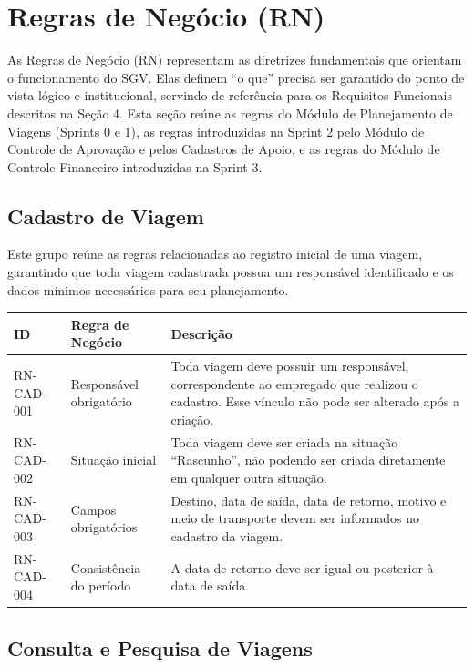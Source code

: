 \documentclass[12pt,article,oneside,a4paper]{abntex2}
\begin{document}
\section{Regras de Negócio (RN)}

As Regras de Negócio (RN) representam as diretrizes fundamentais que orientam
o funcionamento do SGV. Elas definem ``o que'' precisa ser garantido do ponto
de vista lógico e institucional, servindo de referência para os Requisitos
Funcionais descritos na Seção 4. Esta seção reúne as regras do Módulo de
Planejamento de Viagens (Sprints 0 e 1), as regras introduzidas na Sprint 2
pelo Módulo de Controle de Aprovação e pelos Cadastros de Apoio, e as regras
do Módulo de Controle Financeiro introduzidas na Sprint 3.

\subsection{Cadastro de Viagem}

Este grupo reúne as regras relacionadas ao registro inicial de uma viagem,
garantindo que toda viagem cadastrada possua um responsável identificado e os
dados mínimos necessários para seu planejamento.

\begin{xltabular}{\textwidth}{|l|l|Y|}
\hline
{}
\textbf{ID} & \textbf{Regra de Negócio} & \textbf{Descrição} \\
\hline
\endhead
RN-CAD-001 & Responsável obrigatório & Toda viagem deve possuir um responsável, correspondente ao empregado que realizou o cadastro. Esse vínculo não pode ser alterado após a criação. \\
\hline
RN-CAD-002 & Situação inicial & Toda viagem deve ser criada na situação ``Rascunho'', não podendo ser criada diretamente em qualquer outra situação. \\
\hline
RN-CAD-003 & Campos obrigatórios & Destino, data de saída, data de retorno, motivo e meio de transporte devem ser informados no cadastro da viagem. \\
\hline
RN-CAD-004 & Consistência do período & A data de retorno deve ser igual ou posterior à data de saída. \\
\hline
\end{xltabular}

\bigskip

\subsection{Consulta e Pesquisa de Viagens}
\end{document}
